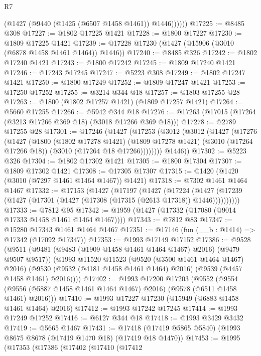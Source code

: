 \begin{lexlean}{R7}
\begin{coremodule}
            (@1427 (@9440 (@1425 (@6507 @1458 @1461)) @1446))))))
@17225 := @8485 @308
@17227 := @1802 @17225 @1421
@17228 := @1800 @17227
@17230 := @1809 @17225 @1421
@17239 := @17228 @17230 (@1427 (@15906 (@3010 (@6878 @1458 @1461 @1464)) @1446))
@17240 := @8485 @326
@17242 := @1802 @17240 @1421
@17243 := @1800 @17242
@17245 := @1809 @17240 @1421
@17246 := @17243 @17245
@17247 := @5223 @308
@17249 := @1802 @17247 @1421
@17250 := @1800 @17249
@17252 := @1809 @17247 @1421
@17253 := @17250 @17252
@17255 := @3214 @344 @18
@17257 := @1803 @17255 @28
@17263 := @1800 (@1802 @17257 @1421) (@1809 @17257 @1421)
@17264 := @5660 @17255
@17266 := @5942 @344 @18
@17276 := @17263 (@17015 (@17264 (@3213 @17266 @369 @18) (@3018 @17266 @369 @18)))
@17278 := @2789 @17255 @28
@17301 := @17246
    (@1427
      (@17253
        (@3012
          (@3012
            (@1427
              (@17276
                (@1427
                  (@1800
                    (@1802 @17278 @1421)
                    (@1809 @17278 @1421)
                    (@3010 (@17264 @17266 @18))
                    (@3010 (@17264 @18 @17266))))))))
        @1446))
@17302 := @5223 @326
@17304 := @1802 @17302 @1421
@17305 := @1800 @17304
@17307 := @1809 @17302 @1421
@17308 := @17305 @17307
@17315 := @1420 (@1420 (@3010 (@7297 @1461 @1464 @1467)) @1421)
@17318 := @7302 @1461 @1464 @1467
@17332 := @17153
    (@1427
      (@17197
        (@1427
          (@17224
            (@1427 (@17239 (@1427 (@17301 (@1427 (@17308 (@17315 (@2613 @17318)) @1446))))))))))
@17333 := @7812 @95
@17342 := @1959 (@1427 (@17332 (@17080 (@9014 @17333 @1458 @1461 @1464 @1467))))
@17343 := @7812 @83
@17347 := @15280 @17343 @1461 @1464 @1467
@17351 := @17146 (fun (__b : @1414) => @17342 (@17092 @17347))
@17353 := @1993 @17149 @17152
@17386 := @9528
    (@9511
      (@9481 (@9483 (@1909 @1458 @1461 @1464 @1467) @2016) (@9479 @9507 @9517))
      (@1993
        @11520
        @11523
        (@9520 (@3500 @1461 @1464 @1467) @2016)
        (@9530 (@9532 (@4181 @1458 @1461 @1464) @2016) (@9539 (@4457 @1458 @1461) @2016))))
@17402 := @1993
    @17200
    @17203
    (@9552 (@9554 (@9556 (@5887 @1458 @1461 @1464 @1467) @2016) (@9578 (@6511 @1458 @1461) @2016)))
@17410 := @1993 @17227 @17230 (@15949 (@6883 @1458 @1461 @1464) @2016)
@17412 := @1993 @17242 @17245
@17414 := @1993 @17249 @17252
@17416 := @6127 @344 @18
@17418 := @1993 @3429 @3432
@17419 := @5665 @1467
@17431 := @17418 (@17419 @5865 @5840) (@1993 @8675 @8678 (@17419 @1470 @18) (@17419 @18 @1470))
@17453 := @1995
    (@17353
      (@17386
        (@17402
          (@17410
            (@17412

\end{coremodule}
\end{lexlean}

